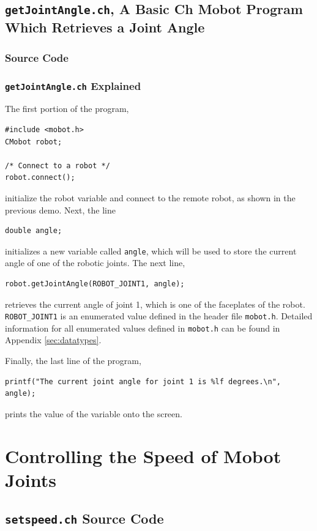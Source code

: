 \documentclass{article}
\begin{document}
\subsection{\texttt{getJointAngle.ch}, A Basic Ch Mobot Program Which Retrieves a Joint Angle}
\subsubsection{Source Code}


\subsubsection{\texttt{getJointAngle.ch} Explained}
The first portion of the program, 
\begin{verbatim}
#include <mobot.h>
CMobot robot;

/* Connect to a robot */
robot.connect();
\end{verbatim}
initialize the robot variable and connect to the remote robot, as shown in the
previous demo. Next, the line
\begin{verbatim}
double angle;
\end{verbatim}
initializes a new variable called \texttt{angle}, which will be used to store
the current angle of one of the robotic joints. The next line,
\begin{verbatim}
robot.getJointAngle(ROBOT_JOINT1, angle);
\end{verbatim}
retrieves the current angle of joint 1, which is one of the faceplates of the
robot. 
\texttt{ROBOT\_JOINT1} is an enumerated value
defined in the header file \texttt{mobot.h}. Detailed information
for all enumerated values defined in \texttt{mobot.h} can be found in 
Appendix \ref{sec:datatypes}.

Finally, the last line of the program,
\begin{verbatim}
printf("The current joint angle for joint 1 is %lf degrees.\n", angle);
\end{verbatim}
prints the value of the variable onto the screen. 


\section{Controlling the Speed of Mobot Joints}
\subsection{\texttt{setspeed.ch} Source Code}

\end{document}
